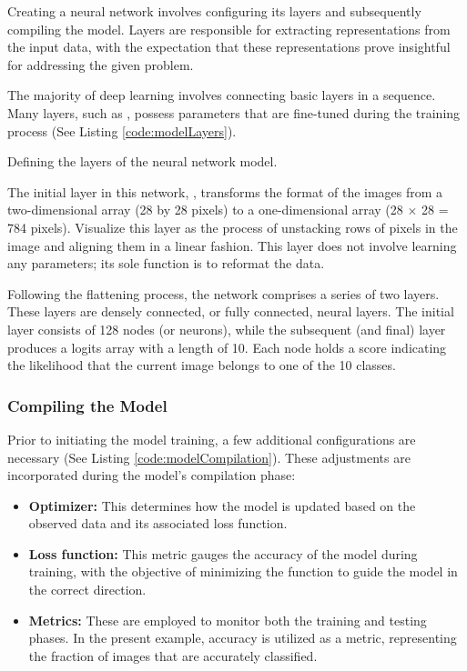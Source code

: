 Creating a neural network involves configuring its layers and subsequently compiling the model. Layers are responsible for extracting representations from the input data, with the expectation that these representations prove insightful for addressing the given problem.

The majority of deep learning involves connecting basic layers in a sequence. Many layers, such as , possess parameters that are fine-tuned during the training process (See Listing \ref{code:modelLayers}).

\begin{code}[h!]
	    
	
	\caption{Defining the layers of the neural network model.}
	\label{code:modelLayers}
\end{code}

The initial layer in this network, , transforms the format of the images from a two-dimensional array (28 by 28 pixels) to a one-dimensional array (28 $\times$ 28 = 784 pixels). Visualize this layer as the process of unstacking rows of pixels in the image and aligning them in a linear fashion. This layer does not involve learning any parameters; its sole function is to reformat the data.

Following the flattening process, the network comprises a series of two  layers. These layers are densely connected, or fully connected, neural layers. The initial  layer consists of 128 nodes (or neurons), while the subsequent (and final) layer produces a logits array with a length of 10. Each node holds a score indicating the likelihood that the current image belongs to one of the 10 classes.


\subsubsection{Compiling the Model}

Prior to initiating the model training, a few additional configurations are necessary (See Listing \ref{code:modelCompilation}). These adjustments are incorporated during the model's compilation phase:

\begin{itemize}
	\item \textbf{Optimizer:} This determines how the model is updated based on the observed data and its associated loss function.
	
	\item \textbf{Loss function:} This metric gauges the accuracy of the model during training, with the objective of minimizing the function to guide the model in the correct direction.
	
	\item \textbf{Metrics:} These are employed to monitor both the training and testing phases. In the present example, accuracy is utilized as a metric, representing the fraction of images that are accurately classified.
\end{itemize}

